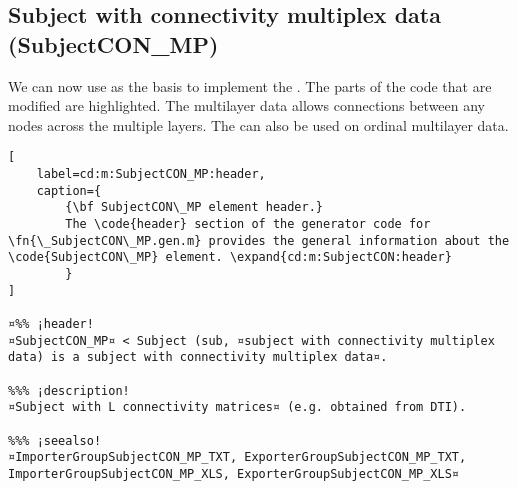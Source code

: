 \documentclass{tufte-handout}
\begin{document}
\clearpage

\subsection{Subject with connectivity multiplex data (SubjectCON\_MP)}

We can now use  as the basis to implement the . The parts of the code that are modified are highlighted.
The multilayer data allows connections between any nodes across the multiple layers. The  can also be used on ordinal multilayer data.
\begin{lstlisting}[
	label=cd:m:SubjectCON_MP:header,
	caption={
		{\bf SubjectCON\_MP element header.}
		The \code{header} section of the generator code for \fn{\_SubjectCON\_MP.gen.m} provides the general information about the \code{SubjectCON\_MP} element. \expand{cd:m:SubjectCON:header}
		}
]

¤%% ¡header!
¤SubjectCON_MP¤ < Subject (sub, ¤subject with connectivity multiplex data) is a subject with connectivity multiplex data¤.

%%% ¡description!
¤Subject with L connectivity matrices¤ (e.g. obtained from DTI).

%%% ¡seealso!
¤ImporterGroupSubjectCON_MP_TXT, ExporterGroupSubjectCON_MP_TXT, ImporterGroupSubjectCON_MP_XLS, ExporterGroupSubjectCON_MP_XLS¤
\end{lstlisting}
\end{document}
